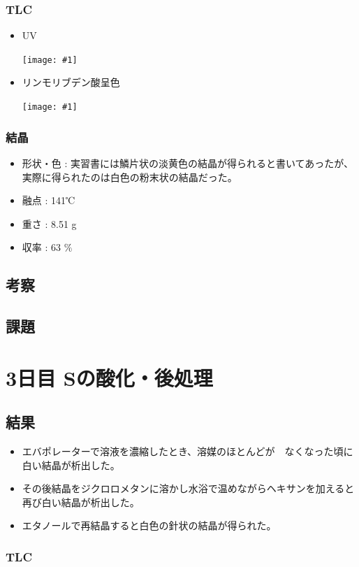 \documentclass[a4paper,papersize,dvipdfmx]{jsarticle}
\newcommand{\pict}[2]{\begin{center} \texttt{[image: \#1]} \end{center}}   %
\begin{document}
\subsubsection*{TLC}
\begin{itemize}
\item UV
\pict{imgs2/tlc1.jpg}{10}

\item リンモリブデン酸呈色
\pict{imgs2/tlc2.jpg}{10}

\end{itemize}
\subsubsection*{結晶}
\begin{itemize}
\item 形状・色 : 実習書には鱗片状の淡黄色の結晶が得られると書いてあったが、実際に得られたのは白色の粉末状の結晶だった。
\item 融点 : 141℃
\item 重さ : 8.51 g
\item 収率 : 63 $\%$

\end{itemize}
\subsection*{考察}
\subsection*{課題}

\section*{3日目 Sの酸化・後処理}
\subsection*{結果}
\begin{itemize}
\item エバポレーターで溶液を濃縮したとき、溶媒のほとんどが　なくなった頃に白い結晶が析出した。
\item その後結晶をジクロロメタンに溶かし水浴で温めながらヘキサンを加えると再び白い結晶が析出した。
\item エタノールで再結晶すると白色の針状の結晶が得られた。

\end{itemize}
\subsubsection*{TLC}
\end{document}
